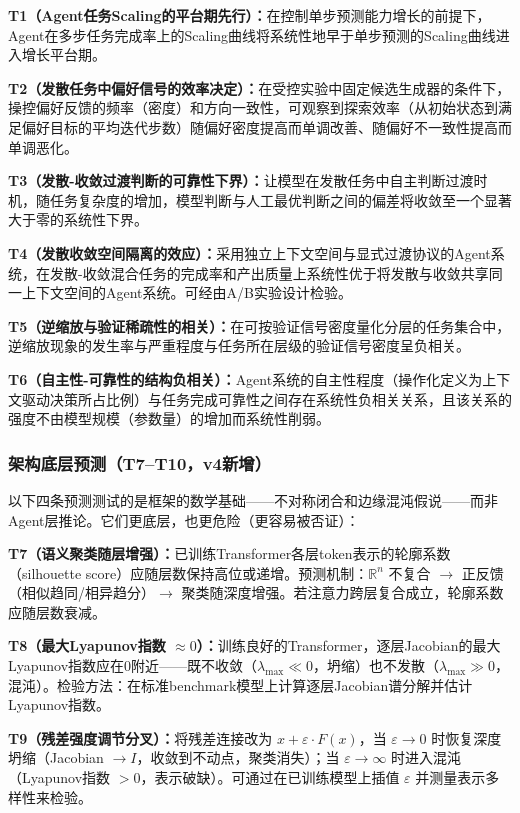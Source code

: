 \documentclass[11pt,a4paper]{article}
\theoremstyle{definition}
\begin{document}
\textbf{T1（Agent任务Scaling的平台期先行）：}在控制单步预测能力增长的前提下，Agent在多步任务完成率上的Scaling曲线将系统性地早于单步预测的Scaling曲线进入增长平台期。

\textbf{T2（发散任务中偏好信号的效率决定）：}在受控实验中固定候选生成器的条件下，操控偏好反馈的频率（密度）和方向一致性，可观察到探索效率（从初始状态到满足偏好目标的平均迭代步数）随偏好密度提高而单调改善、随偏好不一致性提高而单调恶化。

\textbf{T3（发散-收敛过渡判断的可靠性下界）：}让模型在发散任务中自主判断过渡时机，随任务复杂度的增加，模型判断与人工最优判断之间的偏差将收敛至一个显著大于零的系统性下界。

\textbf{T4（发散收敛空间隔离的效应）：}采用独立上下文空间与显式过渡协议的Agent系统，在发散-收敛混合任务的完成率和产出质量上系统性优于将发散与收敛共享同一上下文空间的Agent系统。可经由A/B实验设计检验。

\textbf{T5（逆缩放与验证稀疏性的相关）：}在可按验证信号密度量化分层的任务集合中，逆缩放现象的发生率与严重程度与任务所在层级的验证信号密度呈负相关。

\textbf{T6（自主性-可靠性的结构负相关）：}Agent系统的自主性程度（操作化定义为上下文驱动决策所占比例）与任务完成可靠性之间存在系统性负相关关系，且该关系的强度不由模型规模（参数量）的增加而系统性削弱。

\subsubsection{架构底层预测（T7--T10，v4新增）}

以下四条预测测试的是框架的数学基础——不对称闭合和边缘混沌假说——而非Agent层推论。它们更底层，也更危险（更容易被否证）：

\textbf{T7（语义聚类随层增强）：}已训练Transformer各层token表示的轮廓系数（silhouette score）应随层数保持高位或递增。预测机制：$\mathbb{R}^n$ 不复合 $\to$ 正反馈（相似趋同/相异趋分）$\to$ 聚类随深度增强。若注意力跨层复合成立，轮廓系数应随层数衰减。

\textbf{T8（最大Lyapunov指数 $\approx 0$）：}训练良好的Transformer，逐层Jacobian的最大Lyapunov指数应在0附近——既不收敛（$\lambda_{\max} \ll 0$，坍缩）也不发散（$\lambda_{\max} \gg 0$，混沌）。检验方法：在标准benchmark模型上计算逐层Jacobian谱分解并估计Lyapunov指数。

\textbf{T9（残差强度调节分叉）：}将残差连接改为 $x + \varepsilon \cdot F(x)$，当 $\varepsilon \to 0$ 时恢复深度坍缩（Jacobian $\to I$，收敛到不动点，聚类消失）；当 $\varepsilon \to \infty$ 时进入混沌（Lyapunov指数 $> 0$，表示破缺）。可通过在已训练模型上插值 $\varepsilon$ 并测量表示多样性来检验。
\end{document}
